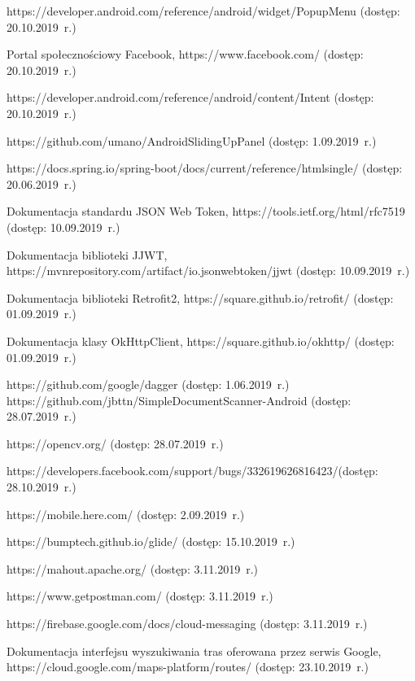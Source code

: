 \begin{thebibliography}{3}
   https://developer.android.com/reference/android/widget/PopupMenu
  (dostęp: 20.10.2019~r.)
  
   Portal społecznościowy Facebook, https://www.facebook.com/ (dostęp: 20.10.2019~r.)
  
   https://developer.android.com/reference/android/content/Intent (dostęp: 20.10.2019~r.)
  
   https://github.com/umano/AndroidSlidingUpPanel (dostęp: 1.09.2019~r.)
  
   https://docs.spring.io/spring-boot/docs/current/reference/htmlsingle/ (dostęp: 20.06.2019~r.)
  
   Dokumentacja standardu JSON Web Token, https://tools.ietf.org/html/rfc7519 (dostęp: 10.09.2019~r.)

   Dokumentacja biblioteki JJWT, https://mvnrepository.com/artifact/io.jsonwebtoken/jjwt (dostęp: 10.09.2019~r.)

   Dokumentacja biblioteki Retrofit2, https://square.github.io/retrofit/ (dostęp: 01.09.2019~r.)

   Dokumentacja klasy OkHttpClient, https://square.github.io/okhttp/ (dostęp: 01.09.2019~r.)
  
   https://github.com/google/dagger (dostęp: 1.06.2019~r.)
   https://github.com/jbttn/SimpleDocumentScanner-Android (dostęp: 28.07.2019~r.)
  
   https://opencv.org/ (dostęp: 28.07.2019~r.)
  
   https://developers.facebook.com/support/bugs/332619626816423/(dostęp: 28.10.2019~r.)
  
   https://mobile.here.com/ (dostęp: 2.09.2019~r.)
  
   https://bumptech.github.io/glide/ (dostęp: 15.10.2019~r.)
  
   https://mahout.apache.org/ (dostęp: 3.11.2019~r.)
  
   https://www.getpostman.com/ (dostęp: 3.11.2019~r.)
  
   https://firebase.google.com/docs/cloud-messaging (dostęp: 3.11.2019~r.)
  
   Dokumentacja interfejsu wyszukiwania tras oferowana przez serwis Google, https://cloud.google.com/maps-platform/routes/ (dostęp: 23.10.2019~r.)


\end{thebibliography}
